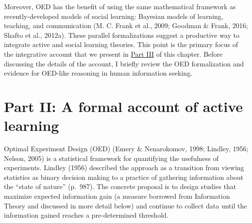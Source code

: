 \documentclass[oneside]{report}
\begin{document}
Moreover, OED has the benefit of using the same mathematical framework
as recently-developed models of social learning: Bayesian models of
learning, teaching, and communication (M. C. Frank et al., 2009; Goodman
\& Frank, 2016; Shafto et al., 2012a). These parallel formalizations
suggest a productive way to integrate active and social learning
theories. This point is the primary focus of the integrative account
that we present in \protect\hyperlink{active_social}{Part III} of this
chapter. Before discussing the details of the account, I briefly review
the OED formalization and evidence for OED-like reasoning in human
information seeking.

\hypertarget{oed}{\section{Part II: A formal account of active
learning}\label{oed}}

Optimal Experiment Design (OED) (Emery \& Nenarokomov, 1998; Lindley,
1956; Nelson, 2005) is a statistical framework for quantifying the
usefulness of experiments. Lindley (1956) described the approach as a
transition from viewing statistics as binary decision making to a
practice of gathering information about the ``state of nature''
(p.~987). The concrete proposal is to design studies that maximize
expected information gain (a measure borrowed from Information Theory
and discussed in more detail below) and continue to collect data until
the information gained reaches a pre-determined threshold.
\end{document}
